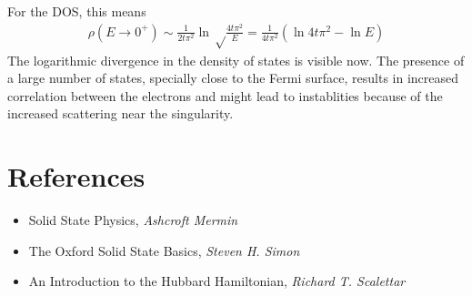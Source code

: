 \documentclass[12pt,onecolumn]{revtex4-2}
\begin{document}
For the DOS, this means
\begin{equation}\begin{aligned}
	\rho(E \to 0^+) \sim \frac{1}{2t\pi^2} \ln \sqrt\frac{4t\pi^2}{E} = \frac{1}{4t\pi^2}\left(\ln 4t\pi^2 - \ln E\right) 
\end{aligned}\end{equation}
The logarithmic divergence in the density of states is visible now. The presence of a large number of states, specially close to the Fermi surface, results in increased correlation between the electrons and might lead to instablities because of the increased scattering near the singularity.

\section{References}
\begin{itemize}
	\item Solid State Physics, \textit{Ashcroft Mermin}
	\item The Oxford Solid State Basics, \textit{Steven H. Simon}
	\item An Introduction to the Hubbard Hamiltonian, \textit{Richard T. Scalettar}
\end{itemize}
\end{document}
